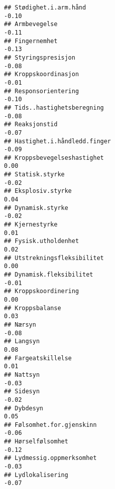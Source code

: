\documentclass[
]{article}
\begin{document}
\begin{verbatim}
## Stødighet.i.arm.hånd                                                             -0.10
## Armbevegelse                                                                     -0.11
## Fingernemhet                                                                     -0.13
## Styringspresisjon                                                                -0.08
## Kroppskoordinasjon                                                               -0.01
## Responsorientering                                                               -0.10
## Tids..hastighetsberegning                                                        -0.08
## Reaksjonstid                                                                     -0.07
## Hastighet.i.håndledd.finger                                                      -0.09
## Kroppsbevegelseshastighet                                                         0.00
## Statisk.styrke                                                                   -0.02
## Eksplosiv.styrke                                                                  0.04
## Dynamisk.styrke                                                                  -0.02
## Kjernestyrke                                                                      0.01
## Fysisk.utholdenhet                                                                0.02
## Utstrekningsfleksibilitet                                                         0.00
## Dynamisk.fleksibilitet                                                           -0.01
## Kroppskoordinering                                                                0.00
## Kroppsbalanse                                                                     0.03
## Nærsyn                                                                           -0.08
## Langsyn                                                                           0.08
## Fargeatskillelse                                                                  0.01
## Nattsyn                                                                          -0.03
## Sidesyn                                                                          -0.02
## Dybdesyn                                                                          0.05
## Følsomhet.for.gjenskinn                                                          -0.06
## Hørselfølsomhet                                                                  -0.12
## Lydmessig.oppmerksomhet                                                          -0.03
## Lydlokalisering                                                                  -0.07

\end{verbatim}
\end{document}

